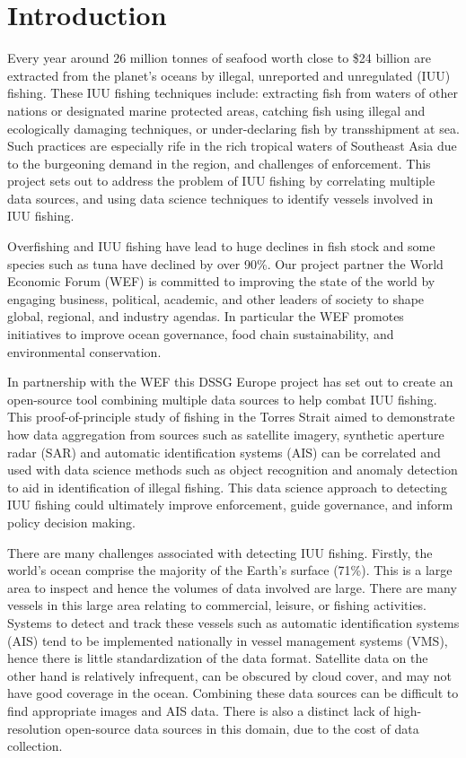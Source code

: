 \section{Introduction}
Every year around 26 million tonnes of seafood worth close to \$24 billion are extracted from the planet's oceans by illegal, unreported and unregulated (IUU) fishing. These IUU fishing techniques include: extracting fish from waters of other nations or designated marine protected areas, catching fish using illegal and ecologically damaging techniques, or under-declaring fish by transshipment at sea. Such practices are especially rife in the rich tropical waters of Southeast Asia due to the burgeoning demand in the region, and challenges of enforcement. This project sets out to address the problem of IUU fishing by correlating multiple data sources, and using data science techniques to identify vessels involved in IUU fishing.

Overfishing and IUU fishing have lead to huge declines in fish stock and some species such as tuna have declined by over 90\%. Our project partner the World Economic Forum (WEF) is committed to improving the state of the world by engaging business, political, academic, and other leaders of society to shape global, regional, and industry agendas. In particular the WEF promotes initiatives to improve ocean governance, food chain sustainability, and environmental conservation.

In partnership with the WEF this DSSG Europe project has set out to create an open-source tool combining multiple data sources to help combat IUU fishing. This proof-of-principle study of fishing in the Torres Strait aimed to demonstrate how data aggregation from sources such as satellite imagery, synthetic aperture radar (SAR) and automatic identification systems (AIS) can be correlated and used with data science methods such as object recognition and anomaly detection to aid in identification of illegal fishing. This data science approach to detecting IUU fishing could ultimately improve enforcement, guide governance, and inform policy decision making.

There are many challenges associated with detecting IUU fishing. Firstly, the world's ocean comprise the majority of the Earth’s surface (71\%). This is a large area to inspect and hence the volumes of data involved are large. There are many vessels in this large area relating to commercial, leisure, or fishing activities. Systems to detect and track these vessels such as automatic identification systems (AIS) tend to be implemented nationally in vessel management systems (VMS), hence there is little standardization of the data format. Satellite data on the other hand is relatively infrequent, can be obscured by cloud cover, and may not have good coverage in the ocean. Combining these data sources can be difficult to find appropriate images and AIS data. There is also a distinct lack of high-resolution open-source data sources in this domain, due to the cost of data collection.

